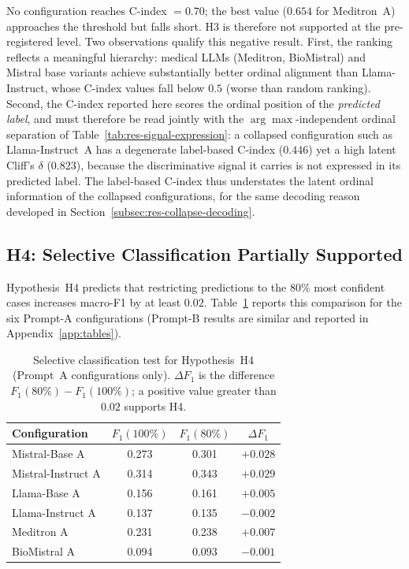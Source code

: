 No configuration reaches C-index $= 0.70$; the best value ($0.654$ for 
Meditron~A) approaches the threshold but falls short. H3 is therefore 
not supported at the pre-registered level. Two observations qualify this 
negative result. First, the ranking reflects a meaningful hierarchy: 
medical LLMs (Meditron, BioMistral) and Mistral base variants achieve 
substantially better ordinal alignment than Llama-Instruct, whose 
C-index values fall below $0.5$ (worse than random ranking). Second, 
the C-index reported here scores the ordinal position of the 
\emph{predicted label}, and must therefore be read jointly with the 
$\arg\max$-independent ordinal separation of 
Table~\ref{tab:res-signal-expression}: a collapsed configuration such as 
Llama-Instruct~A has a degenerate label-based C-index ($0.446$) yet a 
high latent Cliff's $\delta$ ($0.823$), because the discriminative signal 
it carries is not expressed in its predicted label. The label-based 
C-index thus understates the latent ordinal information of the collapsed 
configurations, for the same decoding reason developed in 
Section~\ref{subsec:res-collapse-decoding}.

\subsection{H4: Selective Classification Partially Supported}
\label{subsec:res-h4}

Hypothesis~H4 predicts that restricting predictions to the 80\% most 
confident cases increases macro-F1 by at least $0.02$. Table~\ref{tab:res-h4} 
reports this comparison for the six Prompt-A configurations 
(Prompt-B results are similar and reported in 
Appendix~\ref{app:tables}).

\begin{table}[htbp]
    \centering
    \caption{Selective classification test for Hypothesis~H4 
        (Prompt~A configurations only). $\Delta F_1$ is the difference 
        $F_1(80\%) - F_1(100\%)$; a positive value greater than $0.02$ 
        supports H4.}
    \label{tab:res-h4}
    \small
    \begin{tabular}{@{}lccc@{}}
        \toprule
        \textbf{Configuration} & 
        \boldmath$F_1(100\%)$ & 
        \boldmath$F_1(80\%)$ & 
        \boldmath$\Delta F_1$ \\
        \midrule
        Mistral-Base A     & 0.273 & 0.301 & $+0.028$ \\
        Mistral-Instruct A & 0.314 & 0.343 & $+0.029$ \\
        Llama-Base A       & 0.156 & 0.161 & $+0.005$ \\
        Llama-Instruct A   & 0.137 & 0.135 & $-0.002$ \\
        Meditron A         & 0.231 & 0.238 & $+0.007$ \\
        BioMistral A       & 0.094 & 0.093 & $-0.001$ \\
        \bottomrule
    \end{tabular}
\end{table}

